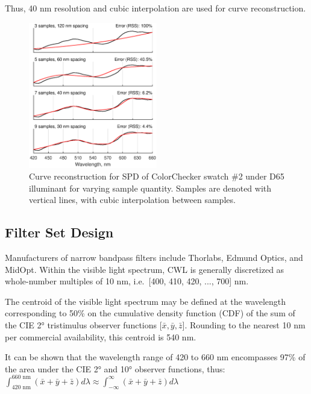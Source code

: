 \documentclass[twocolumn,10pt]{asme2ej}
\newcommand{\id}{\hspace{6 mm}}
\begin{document}
Thus, 40 nm resolution and cubic interpolation are used for curve reconstruction.

\begin{figure}
\centering
\includegraphics[width=0.5\textwidth]{curve_reconstruction_colorchecker_2.eps}
\caption{Curve reconstruction for SPD of ColorChecker swatch \#2 under D65 illuminant for varying sample quantity. Samples are denoted with vertical lines, with cubic interpolation between samples.}
\label{curve_reconstruction_colorchecker_2}
\end{figure}

\subsection{Filter Set Design}

\label{section_filters}

Manufacturers of narrow bandpass filters include Thorlabs, Edmund Optics, and MidOpt. Within the visible light spectrum, CWL is generally discretized as whole-number multiples of 10 nm, i.e.\ [400, 410, 420, ..., 700] nm.

\id The centroid of the visible light spectrum may be defined at the wavelength corresponding to 50\% on the cumulative density function (CDF) of the sum of the CIE 2° tristimulus observer functions [$\bar{x}, \bar{y}, \bar{z}$]. \cite{CVRL} Rounding to the nearest 10 nm per commercial availability, this centroid is 540 nm.

\id It can be shown that the wavelength range of 420 to 660 nm encompasses 97\% of the area under the CIE 2° and 10° observer functions, \cite{CVRL} thus:\\

$ \displaystyle \int_{\textrm{420 nm}}^{\textrm{660 nm}} ( \bar{x}+\bar{y}+\bar{z} ) d\lambda \approx \int_{-\infty}^{\infty} ( \bar{x}+\bar{y}+\bar{z} ) d\lambda $ \\
\end{document}

